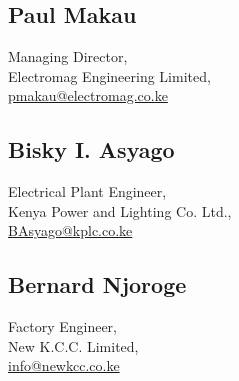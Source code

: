 \documentclass[a4paper]{article}
\begin{document}
\subsection{Paul Makau}
Managing Director,\\
Electromag Engineering Limited,\\
\href{mailto:pmakau@electromag.co.ke}{\ttfamily\color{blue!80!black!90}pmakau@electromag.co.ke}

\subsection{Bisky I. Asyago}
Electrical Plant Engineer,\\
Kenya Power and Lighting Co. Ltd.,\\
\href{mailto:BAsyago@kplc.co.ke}{\ttfamily\color{blue!80!black!90}BAsyago@kplc.co.ke}

\subsection{Bernard Njoroge}
Factory Engineer,\\
New K.C.C. Limited,\\
\href{mailto:info@newkcc.co.ke}{\ttfamily\color{blue!80!black!90}info@newkcc.co.ke}
\end{document}
